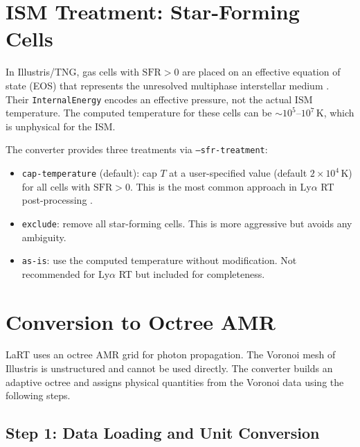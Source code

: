 \documentclass[english,a4paper]{my_memo}
\begin{document}
\section{ISM Treatment: Star-Forming Cells}
\label{sec:ism}

In Illustris/TNG, gas cells with $\mathrm{SFR} > 0$ are placed on an
effective equation of state (EOS) that represents the unresolved
multiphase interstellar medium \cite{springel-hernquist2003}.  Their
\texttt{InternalEnergy} encodes an effective pressure, not the actual
ISM temperature.  The computed temperature for these cells can be
$\sim 10^5$--$10^7$\,K, which is unphysical for the ISM.

The converter provides three treatments via \texttt{--sfr-treatment}:

\begin{itemize}
\item \texttt{cap-temperature} (default): cap $T$ at a user-specified
  value (default $2\times 10^4$\,K) for all cells with $\mathrm{SFR}>0$.
  This is the most common approach in Ly$\alpha$ RT post-processing
  \cite{laursen2009}.

\item \texttt{exclude}: remove all star-forming cells.  This is more
  aggressive but avoids any ambiguity.

\item \texttt{as-is}: use the computed temperature without modification.
  Not recommended for Ly$\alpha$ RT but included for completeness.
\end{itemize}

\section{Conversion to Octree AMR}
\label{sec:conversion}

LaRT uses an octree AMR grid for photon propagation.  The Voronoi mesh
of Illustris is unstructured and cannot be used directly.  The converter
builds an adaptive octree and assigns physical quantities from the
Voronoi data using the following steps.

\subsection{Step 1: Data Loading and Unit Conversion}
\end{document}
